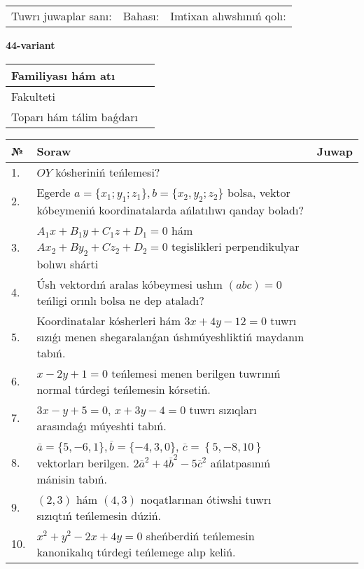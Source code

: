 \documentclass{article}
\begin{document}
\vspace{1cm}

\begin{tabular}{lll}
Tuwrı juwaplar sanı: \underline{\hspace{1.5cm}} & 
Bahası: \underline{\hspace{1.5cm}} & 
Imtixan alıwshınıń qolı: \underline{\hspace{2cm}} \\
\end{tabular}

\egroup

\newpage


\textbf{44-variant}\\

\bgroup
\def\arraystretch{1.6} %

\begin{tabular}{|m{5.7cm}|m{9.5cm}|}
\hline
Familiyası hám atı & \\
\hline
Fakulteti  & \\
\hline
Toparı hám tálim baǵdarı  & \\
\hline
\end{tabular}

\vspace{1cm}

\begin{tabular}{|m{0.7cm}|m{10cm}|m{4cm}|}
\hline
№ & Soraw & Juwap \\
\hline
1. & $OY$ kósheriniń teńlemesi? &  \\
\hline
2. & Egerde $a=\{ x_1; y_1; z_1\}, b=\{ x_2, y_2; z_2\}$ bolsa, vektor kóbeymeniń koordinatalarda ańlatılıwı qanday boladı? &  \\
\hline
3. & $A_1x+B_1y+C_1z+D_1=0$ hám $Ax_2+By_2+Cz_2+D_2=0$ tegislikleri perpendikulyar bolıwı shárti &  \\
\hline
4. & Úsh vektordıń aralas kóbeymesi ushın $(abc)=0$ teńligi orınlı bolsa ne dep ataladı? &  \\
\hline
5. & Koordinatalar kósherleri hám $ 3x+4y-12=0 $ tuwrı sızıǵı menen shegaralanǵan úshmúyeshliktiń maydanın tabıń. &  \\
\hline
6. & $x-2y+1=0$ teńlemesi menen berilgen tuwrınıń normal túrdegi teńlemesin kórsetiń. &  \\
\hline
7. & $3x-y+5=0$, $x+3y-4=0$ tuwrı sızıqları arasındaǵı múyeshti tabıń. &  \\
\hline
8. & $\overline{a}=\{5,-6, 1 \}, \overline{b}=\{-4, 3, 0 \} $, $\overline{c}=\left\{ 5,-8, 10 \right\}$ vektorları berilgen. $2{\overline{a}}^{2}+4{\overline{b}}^{2}-5{\overline{c}}^{2}$ ańlatpasınıń mánisin tabıń. &  \\
\hline
9. & $(2, 3)$ hám $(4, 3)$ noqatlarınan ótiwshi tuwrı sızıqtıń teńlemesin dúziń. &  \\
\hline
10. & $x^{2}+y^{2}-2x+4y=0$ sheńberdiń teńlemesin kanonikalıq túrdegi teńlemege alıp keliń. &  \\
\hline
\end{tabular}
\end{document}
